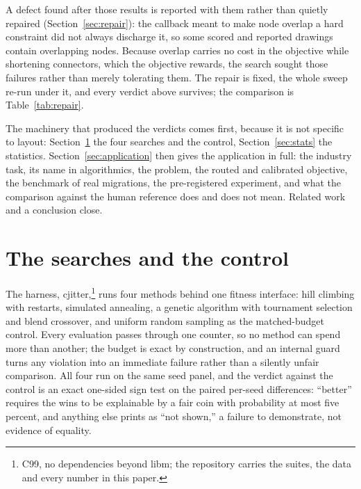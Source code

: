 \documentclass[11pt]{article}
\begin{document}
A defect found after those results is reported with them rather than quietly repaired
(Section~\ref{sec:repair}): the callback meant to make node overlap a hard constraint did not
always discharge it, so some scored and reported drawings contain overlapping nodes. Because
overlap carries no cost in the objective while shortening connectors, which the objective
rewards, the search sought those failures rather than merely tolerating them. The repair is
fixed, the whole sweep re-run under it, and every verdict above survives; the comparison is
Table~\ref{tab:repair}.

The machinery that produced the verdicts comes first, because it is not specific to
layout: Section~\ref{sec:harness} the four searches and the control,
Section~\ref{sec:stats} the statistics. Section~\ref{sec:application} then gives the
application in full: the industry task, its name in algorithmics, the problem, the routed
and calibrated objective, the benchmark of real migrations, the pre-registered experiment,
and what the comparison against the human reference does and does not mean. Related work
and a conclusion close.

\section{The searches and the control}\label{sec:harness}

The harness, cjitter,\footnote{C99, no dependencies beyond libm; the repository carries the
suites, the data and every number in this paper.} runs four methods behind one fitness
interface: hill climbing with restarts, simulated annealing, a genetic algorithm with
tournament selection and blend crossover, and uniform random sampling as the matched-budget
control. Every evaluation passes through one counter, so no method can spend more than
another; the budget is exact by construction, and an internal guard turns any violation
into an immediate failure rather than a silently unfair comparison. All four run on the
same seed panel, and the verdict against the control is an exact one-sided sign test on the
paired per-seed differences: ``better'' requires the wins to be explainable by a fair coin
with probability at most five percent, and anything else prints as ``not shown,'' a failure
to demonstrate, not evidence of equality.
\end{document}
